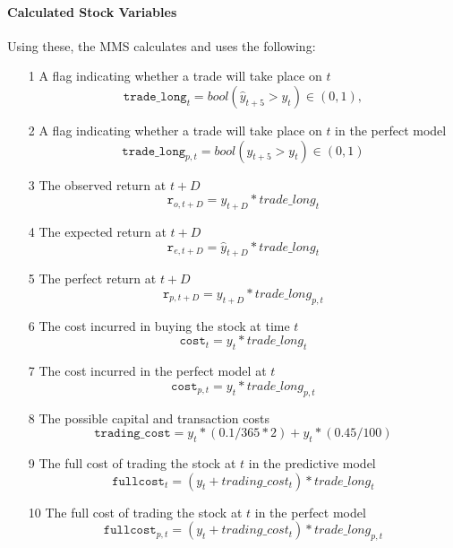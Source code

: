 \documentclass[a4paper,latin]{paper}
\begin{document}
\paragraph{Calculated Stock Variables}

Using these, the MMS calculates and uses the following:

\begin{itemize}
	\item [1] A flag indicating whether a trade will take place on $t$
				\begin{equation}
				\texttt{trade\_long}_t = bool(\hat{y}_{t+5} > y_t) \in (0, 1), 
				\end{equation}
	\item [2] A flag indicating whether a trade will take place on $t$ in the perfect model
				\begin{equation}
				\texttt{trade\_long}_{p,t} = bool({y}_{t+5} > y_t) \in (0, 1)
				\end{equation}
	\item [3] The observed return at $t+D$
				\begin{equation}
				\texttt{r}_{o, t + D} = y_{t+D} * trade\_long_t
				\end{equation}	
	\item [4] The expected return at $t+D$
				\begin{equation}
				\texttt{r}_{e, t + D} = \hat{y}_{t+D} * trade\_long_t 
				\end{equation}
	\item [5] The perfect return at $t+D$
				\begin{equation}
				\texttt{r}_{p, t + D} = y_{t+D} * trade\_long_{p,t}
				\end{equation}
	\item [6] The cost incurred in buying the stock at time $t$
				\begin{equation}
				\texttt{cost}_t = y_t * trade\_long_t
				\end{equation}
	\item [7] The cost incurred in the perfect model at $t$
				\begin{equation}
				\texttt{cost}_{p,t} = y_t * trade\_long_{p,t}
				\end{equation}
	\item [8] The possible capital and transaction costs
				\begin{equation}
				\texttt{trading\_cost}= y_t * (0.1 / 365 * 2) + y_t * (0.45 / 100)
				\end{equation}
	\item [9] The full cost of trading the stock at $t$ in the predictive model
				\begin{equation}
				\texttt{fullcost}_t = (y_t + trading\_cost_t) * trade\_long_t
				\end{equation}	
	\item [10] The full cost of trading the stock at $t$ in the perfect model
				\begin{equation}
				\texttt{fullcost}_{p,t} = (y_t + trading\_cost_t) * trade\_long_{p, t}
				\end{equation}
\end{itemize}
\end{document}
